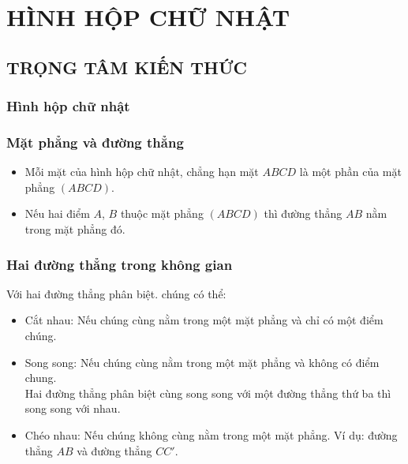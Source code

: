 \section{HÌNH HỘP CHỮ NHẬT}
\subsection{TRỌNG TÂM KIẾN THỨC}
\subsubsection{Hình hộp chữ nhật}

\subsubsection{Mặt phẳng và đường thẳng}
	\begin{itemize}
		\item Mỗi mặt của hình hộp chữ nhật, chẳng hạn mặt $ABCD$ là một phần của mặt phẳng $(ABCD)$.
		\item Nếu hai điểm $A$, $B$ thuộc mặt phẳng $(ABCD)$ thì đường thẳng $AB$ nằm trong mặt phẳng đó.
	\end{itemize}
\subsubsection{Hai đường thẳng trong không gian}
Với hai đường thẳng phân biệt. chúng có thể:
	\begin{itemize}
		\item Cắt nhau: Nếu chúng cùng nằm trong một mặt phẳng và chỉ có một điểm chúng.
		\item Song song: Nếu chúng cùng nằm trong một mặt phẳng và không có điểm chung.\\
		Hai đường thẳng phân biệt cùng song song với một đường thẳng thứ ba thì song song với nhau.
		\item Chéo nhau: Nếu chúng không cùng nằm trong một mặt phẳng. Ví dụ: đường thẳng $AB$ và đường thẳng $CC'$.
	\end{itemize}
